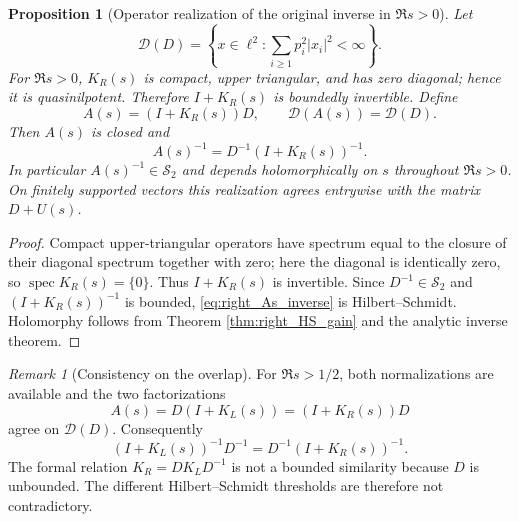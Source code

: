 \documentclass[11pt]{amsart}
\numberwithin{equation}{section}
\theoremstyle{plain}
\newtheorem{proposition}[theorem]{Proposition}
\theoremstyle{definition}
\theoremstyle{remark}
\newtheorem{remark}[theorem]{Remark}
\newcommand{\HS}{\mathcal S_2}
\newcommand{\spec}{\operatorname{spec}}
\begin{document}
\begin{proposition}[Operator realization of the original inverse in $\Re s>0$]
\label{prop:right_inverse_realization}
Let
\begin{equation}
\mathcal D(D)=\left\{x\in\ell^2:\sum_{i\ge1}p_i^2|x_i|^2<\infty\right\}.
\label{eq:D_domain}
\end{equation}
For $\Re s>0$, $K_R(s)$ is compact, upper triangular, and has zero diagonal; hence it is quasinilpotent.  Therefore $I+K_R(s)$ is boundedly invertible.  Define
\begin{equation}
A(s)=(I+K_R(s))D,
\qquad \mathcal D(A(s))=\mathcal D(D).
\label{eq:right_A_operator_domain}
\end{equation}
Then $A(s)$ is closed and
\begin{equation}
\boxed{
A(s)^{-1}=D^{-1}(I+K_R(s))^{-1}.
}
\label{eq:right_As_inverse}
\end{equation}
In particular $A(s)^{-1}\in\HS$ and depends holomorphically on $s$ throughout $\Re s>0$.  On finitely supported vectors this realization agrees entrywise with the matrix $D+U(s)$.
\end{proposition}

\begin{proof}
Compact upper-triangular operators have spectrum equal to the closure of their diagonal spectrum together with zero; here the diagonal is identically zero, so $\spec K_R(s)=\{0\}$.  Thus $I+K_R(s)$ is invertible.  Since $D^{-1}\in\HS$ and $(I+K_R(s))^{-1}$ is bounded, \eqref{eq:right_As_inverse} is Hilbert--Schmidt.  Holomorphy follows from Theorem \ref{thm:right_HS_gain} and the analytic inverse theorem.
\end{proof}

\begin{remark}[Consistency on the overlap]
\label{rem:left_right_consistency}
For $\Re s>1/2$, both normalizations are available and the two factorizations
\begin{equation}
A(s)=D(I+K_L(s))=(I+K_R(s))D
\label{eq:two_factorizations}
\end{equation}
agree on $\mathcal D(D)$.  Consequently
\begin{equation}
(I+K_L(s))^{-1}D^{-1}
=D^{-1}(I+K_R(s))^{-1}.
\label{eq:inverse_factorization_consistency}
\end{equation}
The formal relation $K_R=DK_LD^{-1}$ is not a bounded similarity because $D$ is unbounded.  The different Hilbert--Schmidt thresholds are therefore not contradictory.
\end{remark}
\end{document}
